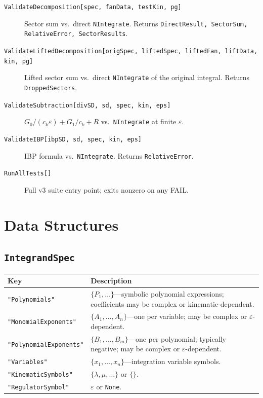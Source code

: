 \documentclass[11pt,a4paper]{article}
\begin{document}
\begin{description}
  \item[\texttt{ValidateDecomposition[spec, fanData, testKin, pg]}] Sector sum vs.\ direct \texttt{NIntegrate}. Returns \texttt{DirectResult, SectorSum, RelativeError, SectorResults}.
  \item[\texttt{ValidateLiftedDecomposition[origSpec, liftedSpec, liftedFan, liftData, kin, pg]}] Lifted sector sum vs.\ direct \texttt{NIntegrate} of the original integral. Returns \texttt{DroppedSectors}.
  \item[\texttt{ValidateSubtraction[divSD, sd, spec, kin, eps]}] $G_0/(c_k\varepsilon)+G_1/c_k+R$ vs.\ \texttt{NIntegrate} at finite $\varepsilon$.
  \item[\texttt{ValidateIBP[ibpSD, sd, spec, kin, eps]}] IBP formula vs.\ \texttt{NIntegrate}. Returns \texttt{RelativeError}.
  \item[\texttt{RunAllTests[]}] Full v3 suite entry point; exits nonzero on any FAIL.
\end{description}

\section{Data Structures}\label{sec:datastructs}

\subsection{\texttt{IntegrandSpec}}
\begin{center}
\begin{tabular}{lp{9cm}}
\toprule
\textbf{Key} & \textbf{Description} \\
\midrule
\texttt{"Polynomials"} & $\{P_1,\ldots\}$---symbolic polynomial expressions; coefficients may be complex or kinematic-dependent. \\
\texttt{"MonomialExponents"} & $\{A_1,\ldots,A_n\}$---one per variable; may be complex or $\varepsilon$-dependent. \\
\texttt{"PolynomialExponents"} & $\{B_1,\ldots,B_m\}$---one per polynomial; typically negative; may be complex or $\varepsilon$-dependent. \\
\texttt{"Variables"} & $\{x_1,\ldots,x_n\}$---integration variable symbols. \\
\texttt{"KinematicSymbols"} & $\{\lambda,\mu,\ldots\}$ or $\{\}$. \\
\texttt{"RegulatorSymbol"} & $\varepsilon$ or \texttt{None}. \\
\bottomrule
\end{tabular}
\end{center}
\end{document}
